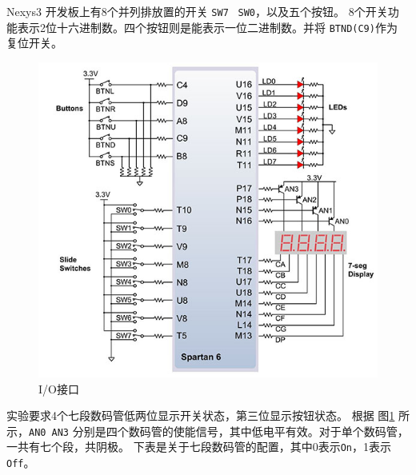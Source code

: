 \documentclass{ctexart}
\begin{document}
            Nexys3 开发板上有8个并列排放置的开关 \verb|SW7|~ \verb|SW0|，以及五个按钮。
            8个开关功能表示2位十六进制数。四个按钮则是能表示一位二进制数。并将 \verb|BTND(C9)|作为
            复位开关。%
            \begin{figure}
\centering
\includegraphics[width=0.7\linewidth]{report-1-io-ports}
\caption{I/O接口}
\label{fig:report-1-io-ports}
\end{figure}
            实验要求4个七段数码管低两位显示开关状态，第三位显示按钮状态。
            根据 图\ref{fig:report-1-io-ports} 所示，\verb|AN0|~\verb|AN3|
            分别是四个数码管的使能信号，其中低电平有效。对于单个数码管，一共有七个段，共阴极。
            下表是关于七段数码管的配置，其中0表示\verb|On|，1表示 \verb|Off|。
\end{document}
